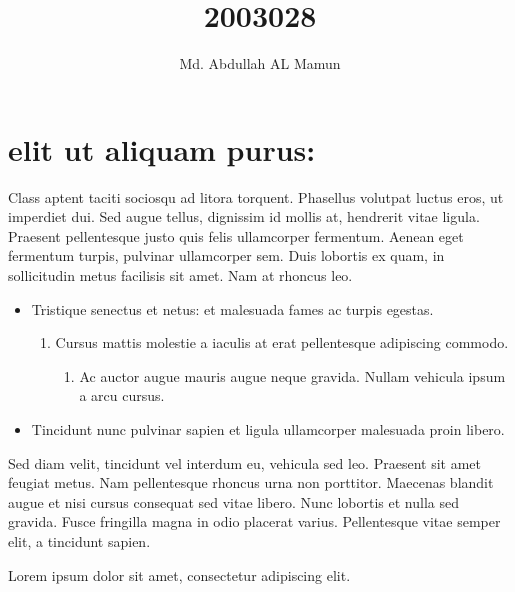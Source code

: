 \documentclass{article}
\title{2003028}
\author{Md. Abdullah AL Mamun}
\begin{document}
\maketitle

\section {elit ut aliquam purus:}
Class aptent taciti sociosqu ad litora torquent.
Phasellus volutpat luctus eros, ut imperdiet dui.
Sed augue tellus, dignissim id mollis at, hendrerit vitae ligula.
Praesent pellentesque justo quis felis ullamcorper fermentum.
Aenean eget fermentum turpis, pulvinar ullamcorper sem.
Duis lobortis ex quam, in sollicitudin metus facilisis sit amet. Nam at rhoncus leo.

\begin{itemize}
    \item Tristique senectus et netus: et malesuada fames ac turpis egestas.
          \begin{enumerate}
              \item Cursus mattis molestie a iaculis at erat pellentesque adipiscing commodo.
                    \begin{enumerate}
                        \item Ac auctor augue mauris augue neque gravida. Nullam vehicula ipsum a arcu cursus.
                    \end{enumerate}
          \end{enumerate}
    \item Tincidunt nunc pulvinar sapien et ligula ullamcorper malesuada proin libero.
\end{itemize}

Sed diam velit, tincidunt vel interdum eu, vehicula sed leo.
Praesent sit amet feugiat metus. Nam pellentesque rhoncus urna non porttitor.
Maecenas blandit augue et nisi cursus consequat sed vitae libero.
Nunc lobortis et nulla sed gravida. Fusce fringilla magna in odio placerat varius.
Pellentesque vitae semper elit, a tincidunt sapien.

\hspace{3cm} Lorem ipsum dolor sit amet, consectetur adipiscing elit.
\end{document}
